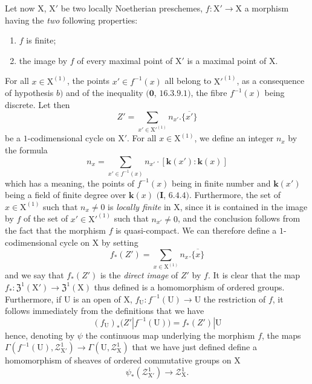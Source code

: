 \begin{env}[21.10.14]
\label{IV.21.10.14}
Let now $\mathrm{X}$, $\mathrm{X}'$ be two locally Noetherian preschemes, $f:\mathrm{X}'\to\mathrm{X}$ a morphism having the \emph{two} following properties:
\begin{enumerate}[label=\emph{\alph*)}]
  \item $f$ is finite;
  \item the image by $f$ of every maximal point of $\mathrm{X}'$ is a maximal point of $\mathrm{X}$.
\end{enumerate}

For all $x\in\mathrm{X}^{(1)}$, the points $x'\in f^{-1}(x)$ all belong to $\mathrm{X}'^{(1)}$, as a consequence of hypothesis $b)$ and of the inequality $(\mathbf{0}$, $16.3.9.1)$, the fibre $f^{-1}(x)$ being discrete.
Let then
\[
  Z'=\sum_{x'\in\mathrm{X}'^{(1)}} n_{x'}.\overline{\{x'\}}
\]
be a $1$-codimensional cycle on $\mathrm{X}'$.
For all $x\in\mathrm{X}^{(1)}$, we define an integer $n_x$ by the formula
\[
  n_x=\sum_{x'\in f^{-1}(x)} n_{x'}\cdot[\boldsymbol{k}(x'):\boldsymbol{k}(x)]
\]
which has a meaning, the points of $f^{-1}(x)$ being in finite number and $\boldsymbol{k}(x')$ being a field of finite degree over $\boldsymbol{k}(x)$ $(\mathbf{I}$, $6.4.4)$.
Furthermore, the set of $x\in\mathrm{X}^{(1)}$ such that $n_x\neq 0$ is \emph{locally finite} in $\mathrm{X}$, since it is contained in the image by $f$ of the set of $x'\in\mathrm{X}'^{(1)}$ such that $n_{x'}\neq 0$, and the conclusion follows from the fact that the morphism $f$ is quasi-compact.
We can therefore define a $1$-codimensional cycle on $\mathrm{X}$ by setting
\[
\label{IV.21.10.14.1}
  f_*(Z')=\sum_{x\in\mathrm{X}^{(1)}} n_x.\overline{\{x\}}
  \tag{21.10.14.1}
\]
and we say that $f_*(Z')$ is the \emph{direct image} of $Z'$ by $f$.
It is clear that the map $f_*:\mathfrak{Z}^1(\mathrm{X}')\to\mathfrak{Z}^1(\mathrm{X})$ thus defined is a homomorphism of ordered groups.
Furthermore, if $\mathrm{U}$ is an open of $\mathrm{X}$, $f_{\mathrm{U}}:f^{-1}(\mathrm{U})\to\mathrm{U}$ the restriction of $f$, it follows immediately from the definitions that we have
\[
\label{IV.21.10.14.2}
  (f_{\mathrm{U}})_*(Z'|f^{-1}(\mathrm{U}))=f_*(Z')|\mathrm{U}
  \tag{21.10.14.2}
\]
hence, denoting by $\psi$ the continuous map underlying the morphism $f$, the maps $\Gamma(f^{-1}(\mathrm{U}),\mathscr{Z}^1_{\mathrm{X}'})\to\Gamma(\mathrm{U},\mathscr{Z}^1_{\mathrm{X}})$ that we have just defined define a homomorphism of sheaves of ordered commutative groups on $\mathrm{X}$
\[
  \psi_*(\mathscr{Z}^1_{\mathrm{X}'})\to\mathscr{Z}^1_{\mathrm{X}}.
\]
\end{env}


